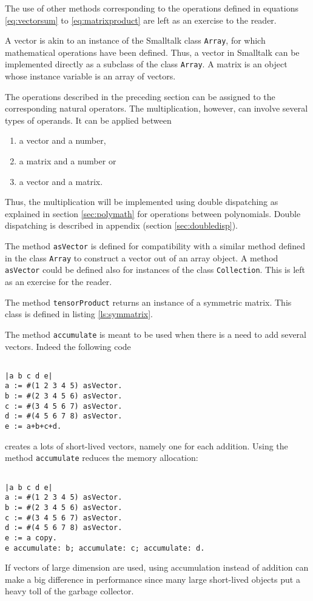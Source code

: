 \documentclass[twoside]{book}
\begin{document}
The use of other methods corresponding to the operations defined
in equations \ref{eq:vectorsum} to \ref{eq:matrixproduct} are left
as an exercise to the reader.

 A vector is akin to an instance of the
Smalltalk class {\tt Array}, for which mathematical operations
have been defined. Thus, a vector in Smalltalk can be implemented
directly as a subclass of the class {\tt Array}. A matrix is an
object whose instance variable is an array of vectors.

The operations described in the preceding section can be assigned
to the corresponding natural operators. The multiplication,
however, can involve several types of operands. It can be applied
between
\begin{enumerate}
  \item a vector and a number,
  \item a matrix and a number or
  \item a vector and a matrix.
\end{enumerate}
Thus, the multiplication will be implemented using double
dispatching as explained in section \ref{sec:polymath} for
operations between polynomials. Double dispatching is described in
appendix (\cf section \ref{sec:doubledisp}).

The method {\tt asVector} is defined for compatibility with a
similar method defined in the class {\tt Array} to construct a
vector out of an array object. A method {\tt asVector} could be
defined also for instances of the class {\tt Collection}. This is
left as an exercise for the reader.

The method {\tt tensorProduct} returns an instance of a symmetric
matrix. This class is defined in listing \ref{ls:symmatrix}.

The method {\tt accumulate} is meant to be used when there is a
need to add several vectors. Indeed the following code
\begin{codeExample}
\begin{verbatim}

|a b c d e|
a := #(1 2 3 4 5) asVector.
b := #(2 3 4 5 6) asVector.
c := #(3 4 5 6 7) asVector.
d := #(4 5 6 7 8) asVector.
e := a+b+c+d.
\end{verbatim}
\end{codeExample}
creates a lots of short-lived vectors, namely one
for each addition. Using the method {\tt accumulate} reduces the
memory allocation:
\begin{codeExample}
\begin{verbatim}

|a b c d e|
a := #(1 2 3 4 5) asVector.
b := #(2 3 4 5 6) asVector.
c := #(3 4 5 6 7) asVector.
d := #(4 5 6 7 8) asVector.
e := a copy.
e accumulate: b; accumulate: c; accumulate: d.
\end{verbatim}
\end{codeExample}
If vectors of large dimension are used, using accumulation instead
of addition can make a big difference in performance since many
large short-lived objects put a heavy toll of the garbage
collector.
\end{document}
